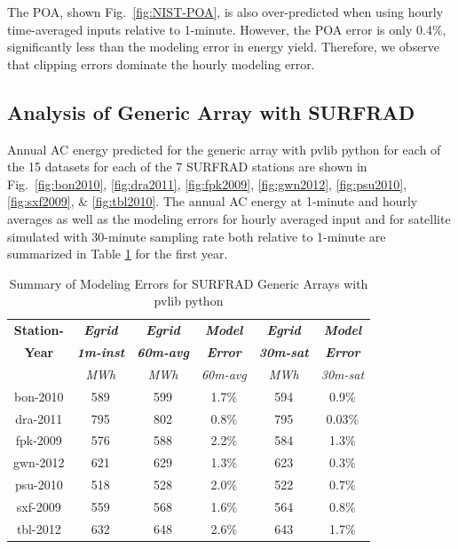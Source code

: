 \documentclass[conference]{IEEEtran}
\begin{document}
The POA, shown Fig.~\ref{fig:NIST-POA}, is also over-predicted when using hourly time-averaged inputs relative to 1-minute. However, the POA error is only 0.4\%, significantly less than the modeling error in energy yield. Therefore, we observe that clipping errors dominate the hourly modeling error.

\subsection{Analysis of Generic Array with SURFRAD}
Annual AC energy predicted for the generic array with pvlib python for each of the 15 datasets for each of the 7 SURFRAD stations are shown in Fig.~\ref{fig:bon2010}, \ref{fig:dra2011}, \ref{fig:fpk2009}, \ref{fig:gwn2012}, \ref{fig:psu2010}, \ref{fig:sxf2009}, \& \ref{fig:tbl2010}. The annual AC energy at 1-minute and hourly averages as well as the modeling errors for hourly averaged input and for satellite simulated with 30-minute sampling rate both relative to 1-minute are summarized in Table  \ref{table:SURFRAD-summary} for the first year.

\begin{table}[htbp]
\caption{Summary of Modeling Errors for SURFRAD Generic Arrays with pvlib python}
\begin{center}
\begin{tabular}{|c|c|c|c|c|c|}
\hline
\textbf{Station-}& \textbf{\textit{Egrid}}& \textbf{\textit{Egrid}}& \textbf{\textit{Model}}& \textbf{\textit{Egrid}}& \textbf{\textit{Model}} \\
              \textbf{Year}& \textbf{\textit{1m-inst}}& \textbf{\textit{60m-avg}}& \textbf{\textit{Error}}& \textbf{\textit{30m-sat}}& \textbf{\textit{Error}} \\
                 & \textit{MWh}& \textit{MWh}& \textit{60m-avg}& \textit{MWh}& \textit{30m-sat} \\
\hline
bon-2010& 589& 599& 1.7\%&594& 0.9\% \\
dra-2011& 795& 802& 0.8\%&795& 0.03\% \\
fpk-2009& 576& 588& 2.2\%&584& 1.3\% \\
gwn-2012& 621& 629& 1.3\%&623& 0.3\% \\
psu-2010& 518& 528& 2.0\%&522& 0.7\% \\
sxf-2009& 559& 568& 1.6\%&564& 0.8\% \\
tbl-2012& 632& 648& 2.6\%&643& 1.7\% \\
\hline
\end{tabular}
\label{table:SURFRAD-summary}
\end{center}
\end{table}
\end{document}
